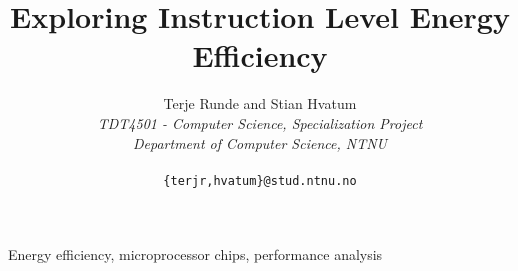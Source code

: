 \documentclass[journal]{IEEEtran}
\begin{document}
\title{Exploring Instruction Level Energy Efficiency}

\author{Terje Runde and Stian Hvatum\\
    \textit{TDT4501 - Computer Science, Specialization Project}\\
\textit{Department of Computer Science, NTNU}\\
{\tiny \hfill\\}
{\small\texttt{\{terjr,hvatum\}@stud.ntnu.no}}
}


\maketitle



\begin{IEEEkeywords}
Energy efficiency, microprocessor chips, performance analysis
\end{IEEEkeywords}








%


%
\end{document}
